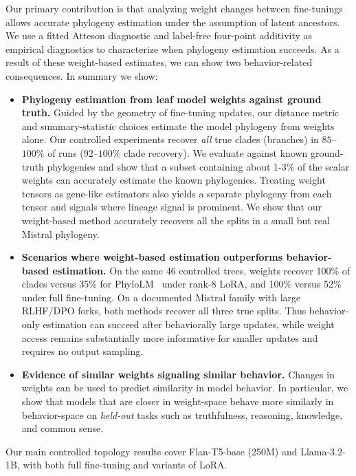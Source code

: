 \documentclass{article}
\theoremstyle{definition}
\theoremstyle{plain}
\begin{document}
Our primary contribution is that analyzing weight changes between fine-tunings allows accurate phylogeny estimation under the assumption of latent ancestors. We use a fitted Atteson diagnostic and label-free four-point additivity as empirical diagnostics to characterize when phylogeny estimation succeeds. As a result of these weight-based estimates, we can show two behavior-related consequences. In summary we show:
\begin{itemize}[leftmargin=1.3em,itemsep=1pt,topsep=2pt,parsep=0pt]
  \item \textbf{Phylogeny estimation from leaf model weights against ground truth.} Guided by the geometry of
    fine-tuning updates, our distance metric and summary-statistic choices estimate the model phylogeny from
    weights alone. Our controlled experiments recover \textit{all} true clades (branches) in $85$--$100\%$ of runs
    ($92$--$100\%$ clade recovery). We evaluate against known ground-truth phylogenies and show that a subset containing about 1-3\% of the scalar weights can accurately estimate the known phylogenies. Treating weight tensors as gene-like estimators also yields a separate phylogeny from each tensor and signals where lineage signal is prominent. We show that our weight-based method accurately recovers all the splits in a small but real Mistral phylogeny.

\item \textbf{Scenarios where weight-based estimation outperforms behavior-based estimation.}
    On the same 46 controlled trees, weights recover 100\% of clades versus 35\% for
PhyloLM~\citep{yax2025phylolm} under rank-8 LoRA, and 100\% versus 52\% under full fine-tuning.
    On a documented Mistral family with large RLHF/DPO forks, both methods
    recover all three true splits. Thus behavior-only estimation can succeed after behaviorally large
    updates, while weight access remains substantially more informative for smaller updates and
    requires no output sampling.
  \item \textbf{Evidence of similar weights signaling similar behavior.} Changes in weights can be used to predict similarity in model behavior.  In particular, we show that models that are closer in weight-space behave more similarly in behavior-space on \textit{held-out} tasks such as truthfulness, reasoning, knowledge, and common sense.

\end{itemize}
Our main controlled topology results cover Flan-T5-base (250M) and Llama-3.2-1B, with both full
fine-tuning and variants of LoRA.
\end{document}
